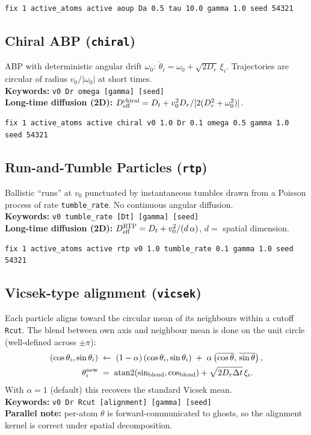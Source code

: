 \documentclass[11pt,a4paper]{article}
\begin{document}
\begin{lstlisting}
fix 1 active_atoms active aoup Da 0.5 tau 10.0 gamma 1.0 seed 54321
\end{lstlisting}

\subsection{Chiral ABP (\texttt{chiral})}
ABP with deterministic angular drift $\omega_0$:
$\dot\theta_i = \omega_0 + \sqrt{2D_r}\,\xi_i$.  Trajectories are circular
of radius $v_0/|\omega_0|$ at short times.\\
\textbf{Keywords:} \texttt{v0 Dr omega [gamma] [seed]}\\
\textbf{Long-time diffusion (2D):}\quad
$D_{\rm eff}^{\rm chiral}=D_t + v_0^2 D_r/[2(D_r^2+\omega_0^2)]$.

\begin{lstlisting}
fix 1 active_atoms active chiral v0 1.0 Dr 0.1 omega 0.5 gamma 1.0 seed 54321
\end{lstlisting}

\subsection{Run-and-Tumble Particles (\texttt{rtp})}
Ballistic ``runs'' at $v_0$ punctuated by instantaneous tumbles drawn from a
Poisson process of rate \texttt{tumble\_rate}.  No continuous angular
diffusion.\\
\textbf{Keywords:} \texttt{v0 tumble\_rate [Dt] [gamma] [seed]}\\
\textbf{Long-time diffusion (2D):}\quad
$D_{\rm eff}^{\rm RTP}=D_t+v_0^2/(d\,\alpha)$, $d=$ spatial dimension.

\begin{lstlisting}
fix 1 active_atoms active rtp v0 1.0 tumble_rate 0.1 gamma 1.0 seed 54321
\end{lstlisting}

\subsection{Vicsek-type alignment (\texttt{vicsek})}
Each particle aligns toward the circular mean of its neighbours within a
cutoff \texttt{Rcut}.  The blend between own axis and neighbour mean is
done on the unit circle (well-defined across $\pm\pi$):
\begin{align*}
(\cos\theta_i,\sin\theta_i)\;&\leftarrow\;(1-\alpha)\,(\cos\theta_i,\sin\theta_i)
\;+\;\alpha\,\bigl(\overline{\cos\theta},\,\overline{\sin\theta}\bigr)\,, \\
\theta_i^{\rm new}\;&=\;\mathrm{atan2}(\sin_{\rm blend},\cos_{\rm blend})
+ \sqrt{2D_r\Delta t}\,\xi_i .
\end{align*}
With $\alpha=1$ (default) this recovers the standard Vicsek mean.\\
\textbf{Keywords:} \texttt{v0 Dr Rcut [alignment] [gamma] [seed]}\\
\textbf{Parallel note:} per-atom $\theta$ is forward-communicated to ghosts,
so the alignment kernel is correct under spatial decomposition.
\end{document}
